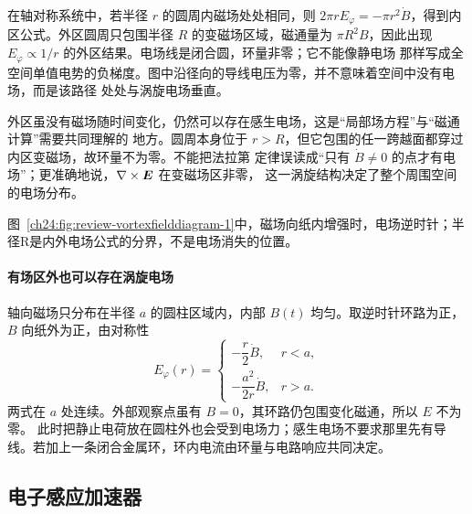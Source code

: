 {在轴对称系统中，若半径 $r$ 的圆周内磁场处处相同，则
$2\pi rE_\varphi=-\pi r^2\dot B$，得到内区公式。外区圆周只包围半径 $R$ 的变磁场区域，磁通量为
$\pi R^2B$，因此出现 $E_\varphi\propto1/r$ 的外区结果。电场线是闭合圆，环量非零；它不能像静电场
那样写成全空间单值电势的负梯度。图中沿径向的导线电压为零，并不意味着空间中没有电场，而是该路径
处处与涡旋电场垂直。

外区虽没有磁场随时间变化，仍然可以存在感生电场，这是“局部场方程”与“磁通计算”需要共同理解的
地方。圆周本身位于 $r>R$，但它包围的任一跨越面都穿过内区变磁场，故环量不为零。不能把法拉第
定律误读成“只有 $\dot B\ne0$ 的点才有电场”；更准确地说，$\nabla\times\bm{E}$ 在变磁场区非零，
这一涡旋结构决定了整个周围空间的电场分布。

图~\ref{ch24:fig:review-vortexfielddiagram-1}中，磁场向纸内增强时，电场逆时针；半径R是内外电场公式的分界，不是电场消失的位置。
\par\noindent\begin{minipage}{\linewidth}
\vortexFieldDiagram
{}
\end{minipage}\par\medskip


\paragraph{有场区外也可以存在涡旋电场}
轴向磁场只分布在半径 $a$ 的圆柱区域内，内部 $B(t)$ 均匀。取逆时针环路为正，$B$ 向纸外为正，由对称性
\[
 E_\varphi(r)=\begin{cases}
 -\dfrac r2\dot B,&r<a,\\[3pt]
 -\dfrac{a^2}{2r}\dot B,&r>a.
 \end{cases}
\]
两式在 $a$ 处连续。外部观察点虽有 $B=0$，其环路仍包围变化磁通，所以 $E$ 不为零。
此时把静止电荷放在圆柱外也会受到电场力；感生电场不要求那里先有导线。若加上一条闭合金属环，环内电流由环量与电路响应共同决定。


\subsection{电子感应加速器}


}
